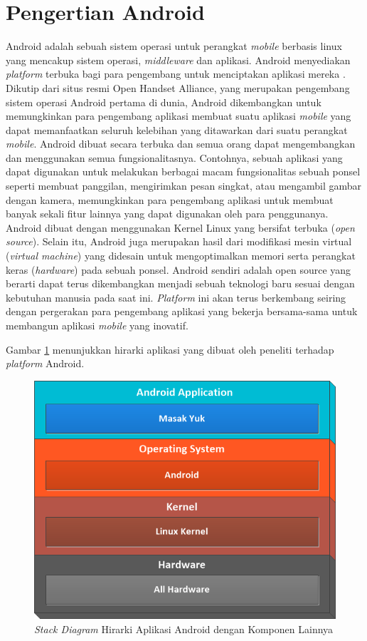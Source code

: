 	
	
\section{Pengertian Android}
	Android adalah sebuah sistem operasi untuk perangkat \emph{mobile} berbasis linux yang mencakup sistem operasi, \emph{middleware} dan aplikasi. Android menyediakan \emph{platform} terbuka bagi para pengembang untuk menciptakan aplikasi mereka \cite{murtiwiyati}. Dikutip dari situs resmi Open Handset Alliance, yang merupakan pengembang sistem operasi Android pertama di dunia, Android dikembangkan untuk memungkinkan para pengembang aplikasi membuat suatu aplikasi \emph{mobile} yang dapat memanfaatkan seluruh kelebihan yang ditawarkan dari suatu perangkat \emph{mobile}. Android dibuat secara terbuka dan semua orang dapat mengembangkan dan menggunakan semua fungsionalitasnya. Contohnya, sebuah aplikasi yang dapat digunakan untuk melakukan berbagai macam fungsionalitas sebuah ponsel seperti membuat panggilan, mengirimkan pesan singkat, atau mengambil gambar dengan kamera, memungkinkan para pengembang aplikasi untuk membuat banyak sekali fitur lainnya yang dapat digunakan oleh para penggunanya. Android dibuat dengan menggunakan Kernel Linux yang bersifat terbuka (\emph{open source}). Selain itu, Android juga merupakan hasil dari modifikasi mesin virtual (\emph{virtual machine}) yang didesain untuk mengoptimalkan memori serta perangkat keras (\emph{hardware}) pada sebuah ponsel. Android sendiri adalah open source yang berarti dapat terus dikembangkan menjadi sebuah teknologi baru sesuai dengan kebutuhan manusia pada saat ini. \emph{Platform} ini akan terus berkembang seiring dengan pergerakan para pengembang aplikasi yang bekerja bersama-sama untuk membangun aplikasi \emph{mobile} yang inovatif. 
	
	Gambar \ref{android-sbg-platform} menunjukkan hirarki aplikasi yang dibuat oleh peneliti terhadap \textit{platform} Android.   
	
	\begin{figure}[H]
		\centering
		\includegraphics[width=1\textwidth]{gambar/stack-diagram-bab-2}
		\caption{\textit{Stack Diagram} Hirarki Aplikasi Android dengan Komponen Lainnya}
		\label{android-sbg-platform}
	\end{figure}
	

